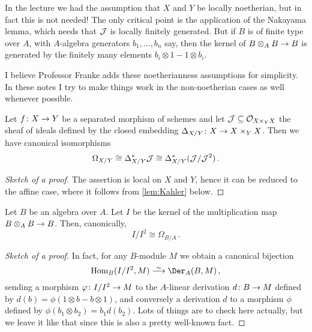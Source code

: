 \begin{rem*}\label{rem*:noNoetherian}
	In the lecture we had the assumption that $X$ and $Y$ be locally noetherian, but in fact this is not needed! The only critical point is the application of the Nakayama lemma, which needs that $\mathcal{J}$ is locally finitely generated. But if $B$ is of finite type over $A$, with $A$-algebra generators $b_1,\dotsc,b_n$ say, then the kernel of $B\otimes_AB\morphism B$ is generated by the finitely many elements $b_i\otimes 1-1\otimes b_i$.
	
	I believe Professor Franke adds these noetherianness assumptions for simplicity. In these notes I try to make things work in the non-noetherian cases as well whenever possible.
\end{rem*}
\begin{prop}\label{prop:Kahler}
	Let $f\colon X\morphism Y$ be a separated morphism of schemes and let $\mathcal{J}\subseteq \mathcal{O}_{X\times_YX}$ the sheaf of ideals defined by the closed embedding $\Delta_{X/Y}\colon X\morphism X\times_YX$. Then we have canonical isomorphisms
	\begin{equation*}
		\Omega_{X/Y}\cong \Delta_{X/Y}^*\mathcal{J}\cong \Delta_{X/Y}^*(\mathcal{J}/\mathcal{J}^2)\,.
	\end{equation*}
\end{prop}
\begin{proof}[Sketch of a proof]
	The assertion is local on $X$ and $Y$, hence it can be reduced to the affine case, where it follows from \cref{lem:Kahler} below.
\end{proof}
\begin{lem}\label{lem:Kahler}
	Let $B$ be an algebra over $A$. Let $I$ be the kernel of the multiplication map $B\otimes_AB\morphism B$. Then, canonically, 
	\begin{equation*}
		I/I^2\cong \Omega_{B/A}\,.
	\end{equation*}
\end{lem}
\begin{proof}[Sketch of a proof]
In fact, for any $B$-module $M$ we obtain a canonical bijection
\begin{equation*}
\Hom_B(I/I^2,M)\isomorphism \Der_A(B,M)\,,
\end{equation*}
sending a morphism $\phi\colon I/I^2\morphism M$ to the $A$-linear derivation $d\colon B\morphism M$ defined by $d(b)=\phi(1\otimes b - b\otimes 1)$, and conversely a derivation $d$ to a morphism $\phi$ defined by $\phi(b_1\otimes b_2)=b_1d(b_2)$. Lots of things are to check here actually, but we leave it like that since this is also a pretty well-known fact.
\end{proof}
